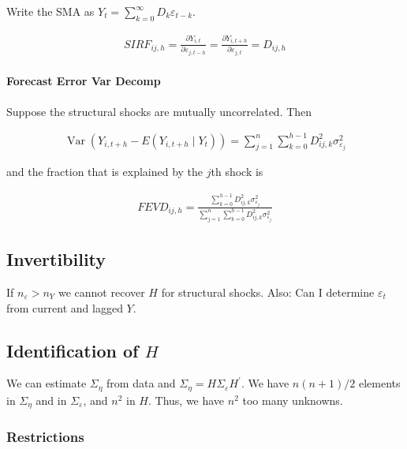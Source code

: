 Write the SMA as $Y_t=\sum_{k=0}^{\infty} D_k \varepsilon_{t-k}$. 

\begin{align*}
    S I R F_{i j, h}=\frac{\partial Y_{i, t}}{\partial \varepsilon_{j, t-h}}=\frac{\partial Y_{i, t+h}}{\partial \varepsilon_{j, t}}=D_{i j, h}
\end{align*}

\paragraph{Forecast Error Var Decomp}

Suppose the structural shocks are mutually uncorrelated. Then 

\begin{align*}
    \operatorname{Var}\left(Y_{i, t+h}-E\left(Y_{i, t+h} \mid Y_t\right)\right)=\sum_{j=1}^n \sum_{k=0}^{h-1} D_{i j, k}^2 \sigma_{\varepsilon_j}^2
\end{align*}

and the fraction that is explained by the $j$th shock is

\begin{align*}
    F E V D_{i j, h}=\frac{\sum_{k=0}^{h-1} D_{i j, k}^2 \sigma_{\varepsilon_j}^2}{\sum_{j=1}^n \sum_{k=0}^{h-1} D_{i j, k}^2 \sigma_{\varepsilon_j}^2}
\end{align*}

\subsection{Invertibility}

If $n_\varepsilon > n_Y$ we cannot recover $H$ for structural shocks. Also: Can I determine $\varepsilon_t$ from current and lagged $Y$.

\subsection{Identification of $H$}

We can estimate $\Sigma_\eta$ from data and $\Sigma_\eta=H\Sigma_\varepsilon H^\prime$. We have $n(n+1)/2$ elements in $\Sigma_\eta$ and in $\Sigma_\varepsilon$, and $n^2$ in $H$. Thus, we have $n^2$ too many unknowns.

\subsubsection{Restrictions}

